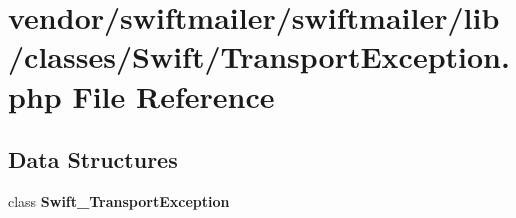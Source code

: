 \section{vendor/swiftmailer/swiftmailer/lib/classes/\+Swift/\+Transport\+Exception.php File Reference}
\label{_transport_exception_8php}
\subsection*{Data Structures}
\begin{DoxyCompactItemize}
\item 
class {\bf Swift\+\_\+\+Transport\+Exception}
\end{DoxyCompactItemize}
